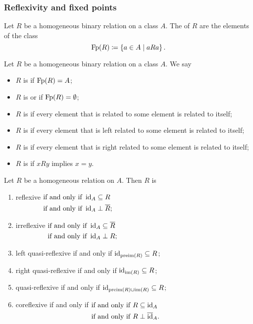 \subsubsection{Reflexivity and fixed points}
\begin{definition}
Let $R$ be a homogeneous binary relation on a class $A$. The  of $R$ are the elements of the class
\[ \operatorname{Fp}(R) \coloneqq \left\{ a\in A \;\middle|\; aRa \right\}. \]
\end{definition}


\begin{definition}
Let $R$ be a homogeneous binary relation on a class $A$. We say
\begin{itemize}
\item $R$ is  if $\operatorname{Fp}(R) = A$;
\item $R$ is  or  if $\operatorname{Fp}(R) = \emptyset$;
\item $R$ is  if every element that is related to some element is related to itself;
\item $R$ is  if every element that is left related to some element is related to itself;
\item $R$ is  if every element that is right related to some element is related to itself;
\item $R$ is  if $xRy$ implies $x=y$.
\end{itemize}
\end{definition}

\begin{lemma} \label{relationalReflexivityEquivalents}
Let $R$ be a homogeneous relation on $A$. Then $R$ is
\begin{enumerate}
\item reflexive $\begin{aligned}[t]
&\text{\textup{if and only if}}\; \operatorname{id}_A \subseteq R \\
&\text{\textup{if and only if}}\; \operatorname{id}_A \perp \overline{R};
\end{aligned}$
\item irreflexive $\begin{aligned}[t]
&\text{\textup{if and only if}}\; \operatorname{id}_A \subseteq \overline{R} \\
&\text{\textup{if and only if}}\; \operatorname{id}_A \perp R;
\end{aligned}$
\item left quasi-reflexive \textup{if and only if} $\operatorname{id}_{\operatorname{preim}(R)} \subseteq R$;
\item right quasi-reflexive \textup{if and only if} $\operatorname{id}_{\operatorname{im}(R)} \subseteq R$;
\item quasi-reflexive \textup{if and only if} $\operatorname{id}_{\operatorname{preim}(R)\cup \operatorname{im}(R)} \subseteq R$;
\item coreflexive \textup{if and only if} $\begin{aligned}[t]
&\text{\textup{if and only if}}\; R \subseteq \operatorname{id}_A \\
&\text{\textup{if and only if}}\; R \perp \overline{\operatorname{id}}_A.
\end{aligned}$
\end{enumerate}
\end{lemma}

